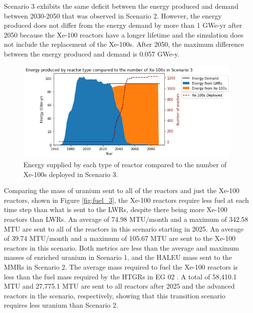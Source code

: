 Scenario 3 exhibits the same deficit between the energy produced and 
demand between 2030-2050 that was observed in Scenario 2. However, the 
energy produced does not differ from the energy demand by more than 1 GWe-yr 
after 2050 because the Xe-100 reactors have a longer lifetime and the 
simulation does not include the replacement of the Xe-100s. After 2050, the 
maximum difference between the energy produced and demand is 0.057 GWe-y. 

\begin{figure}
    \centering 
    \includegraphics[width=\textwidth]{../figures/energy_scenario3.png}
    \caption{Energy supplied by each type of reactor compared to the number of 
    Xe-100s deployed in Scenario 3.}
    \label{fig:energy_rx_3}
\end{figure}

Comparing the mass of uranium sent to all of the reactors and just the Xe-100 
reactors, shown in Figure \ref{fig:fuel_3}, the Xe-100 reactors 
require less fuel at each time step than what is sent to the \glspl{LWR}, 
despite there being more Xe-100 reactors than \glspl{LWR}. An average of 
74.98 MTU/month and a maximum of 342.58 MTU are sent to all of the reactors 
in this scenario starting in 2025. An average of 39.74 
MTU/month and a maximum of 105.67 MTU are sent to the Xe-100 reactors in 
this scenario. Both metrics are less than the 
average and maximum masses of enriched uranium  
in Scenario 1, and the \gls{HALEU} mass sent to the \glspl{MMR} in 
Scenario 2. The average mass required to fuel the Xe-100 reactors is less 
than the fuel mass required by the \glspl{HTGR} in \gls{EG} 02 
\cite{wigeland_nuclear_2014}. A total of 58,410.1 MTU and 27,775.1 MTU are sent to 
all reactors after 2025 and the advanced reactors in the scenario, respectively, 
showing
that this transition scenario requires less uranium than Scenario 2. 

